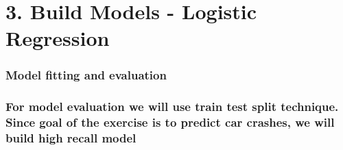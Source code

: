 \documentclass[]{article}
\newenvironment{Shaded}{\begin{snugshade}}{\end{snugshade}}
\newcommand{\DecValTok}[1]{\textcolor[rgb]{0.00,0.00,0.81}{#1}}
\newcommand{\KeywordTok}[1]{\textcolor[rgb]{0.13,0.29,0.53}{\textbf{#1}}}
\newcommand{\NormalTok}[1]{#1}
\newcommand{\OperatorTok}[1]{\textcolor[rgb]{0.81,0.36,0.00}{\textbf{#1}}}
\newcommand{\StringTok}[1]{\textcolor[rgb]{0.31,0.60,0.02}{#1}}
\begin{document}
\begin{Shaded}
\end{Shaded}

\hypertarget{build-models---logistic-regression}{%
\section{3. Build Models - Logistic
Regression}\label{build-models---logistic-regression}}

\hypertarget{model-fitting-and-evaluation}{%
\subsubsection{\texorpdfstring{\textbf{Model fitting and
evaluation}}{Model fitting and evaluation}}\label{model-fitting-and-evaluation}}

\hypertarget{for-model-evaluation-we-will-use-train-test-split-technique.-since-goal-of-the-exercise-is-to-predict-car-crashes-we-will-build-high-recall-model}{%
\subsubsection{\texorpdfstring{\textbf{For model evaluation we will use
train test split technique. Since goal of the exercise is to predict car
crashes, we will build high recall
model}}{For model evaluation we will use train test split technique. Since goal of the exercise is to predict car crashes, we will build high recall model}}\label{for-model-evaluation-we-will-use-train-test-split-technique.-since-goal-of-the-exercise-is-to-predict-car-crashes-we-will-build-high-recall-model}}
\end{document}
